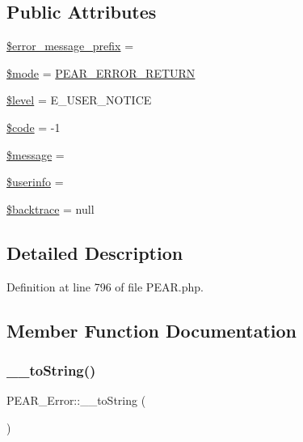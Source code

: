 \subsection*{Public Attributes}
\begin{DoxyCompactItemize}
\item 
\hyperlink{classPEAR__Error_aea8e8d491c90daabbc7de7ef8d9eef2d}{\$error\+\_\+message\+\_\+prefix} = \textquotesingle{}\textquotesingle{}
\item 
\hyperlink{classPEAR__Error_a37fd8f51c6a1a0df165b7e36c88fbea7}{\$mode} = \hyperlink{PEAR_8php_a90d8915cb5b94d81cd4e1efa9c75c66a}{P\+E\+A\+R\+\_\+\+E\+R\+R\+O\+R\+\_\+\+R\+E\+T\+U\+RN}
\item 
\hyperlink{classPEAR__Error_a3fad062a32df55f9bd17af007e16cd49}{\$level} = E\+\_\+\+U\+S\+E\+R\+\_\+\+N\+O\+T\+I\+CE
\item 
\hyperlink{classPEAR__Error_ae7c2938ab048474acaa2755a0161da3e}{\$code} = -\/1
\item 
\hyperlink{classPEAR__Error_a21cd38ff638a63b3d6506d994bc488df}{\$message} = \textquotesingle{}\textquotesingle{}
\item 
\hyperlink{classPEAR__Error_ad201e08b4f3faace7a729ccf2744fdee}{\$userinfo} = \textquotesingle{}\textquotesingle{}
\item 
\hyperlink{classPEAR__Error_a8b3d92f4ec98d4af469e38a8f1030ff4}{\$backtrace} = null
\end{DoxyCompactItemize}


\subsection{Detailed Description}


Definition at line 796 of file P\+E\+A\+R.\+php.



\subsection{Member Function Documentation}
\mbox{\label{classPEAR__Error_a82c4bf3c440d5b8663b214d799d08d74}} 
\subsubsection{\texorpdfstring{\+\_\+\+\_\+to\+String()}{\_\_toString()}}
{\footnotesize\ttfamily P\+E\+A\+R\+\_\+\+Error\+::\+\_\+\+\_\+to\+String (\begin{DoxyParamCaption}{ }\end{DoxyParamCaption})}



